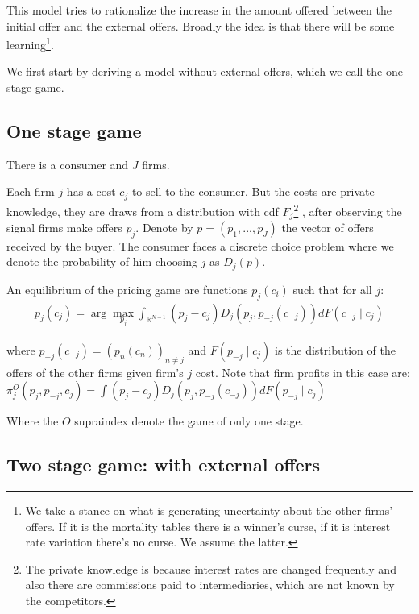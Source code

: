 \documentclass[12pt]{article}
\begin{document}
This model tries to rationalize the increase in the amount offered between the initial offer and the external offers. Broadly the idea is that there will be some learning\footnote{We take a stance on what is generating uncertainty about the other firms' offers. If it is the mortality tables there is a winner's curse, if it is interest rate variation there's no curse. We assume the latter. }. 

We first start by deriving a model without external offers, which we call the one stage game. 

\subsection{One stage game}
There is a consumer and $J$ firms. 

Each firm $j$ has a cost $c_j$ to sell to the consumer. But the costs are private knowledge, they are draws from a distribution with cdf $F_j$\footnote{The private knowledge is because interest rates are changed frequently and also there are commissions paid to intermediaries, which are not known by the competitors. 
} , after observing the signal firms make  offers $p_j$.  Denote by $p = (p_1, ..., p_J)$ the vector of offers received by the buyer.  The consumer faces a discrete choice problem where we denote the probability of him choosing $j$ as $D_j(p)$. 

An equilibrium of the pricing game are functions $p_j(c_i)$ such that for all $j$:
\begin{align}
\label{eq:base_equilibrium} %
    p_j(c_j) = \arg \max_{p_j} \int_{\mathbb{R}^{N-1}}^{} (p_j - c_j) D_j(p_j, p_{-j}(c_{-j})) dF(c_{-j} \mid c_j)
\end{align} 

where $p_{-j}(c_{-j}) = (p_n(c_n))_{n \neq j}$ and $F(p_{-j} \mid c_j)$ is the distribution of the offers of the other firms given firm's $j$ cost. Note that firm profits in this case are: $\pi_j^{O}(p_j, p_{-j}, c_j) = \int (p_j - c_j) D_j(p_j, p_{-j}(c_{-j})) dF(p_{-j} \mid c_j)$

Where the $O$ supraindex denote the game of only one stage. 


\subsection{Two stage game:  with external offers}
\end{document}
